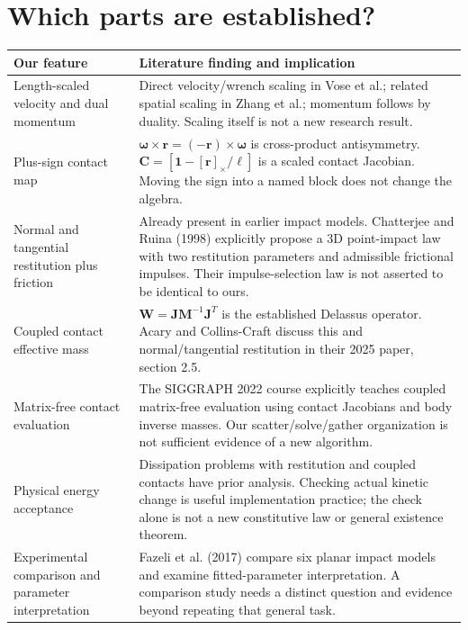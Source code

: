 \documentclass[11pt,a4paper]{article}
\begin{document}
\section{Which parts are established?}
\begin{center}\small
\begin{tabular}{p{45mm}p{102mm}}
\hline
Our feature & Literature finding and implication\\
\hline
Length-scaled velocity and dual momentum & Direct velocity/wrench scaling in Vose et al.; related spatial scaling in Zhang et al.; momentum follows by duality. Scaling itself is not a new research result.\\[3pt]
Plus-sign contact map & $\boldsymbol\omega\times\mathbf r=(-\mathbf r)\times\boldsymbol\omega$ is cross-product antisymmetry. $\mathbf C=[\mathbf1\ {-\,[\mathbf r]_\times/\ell}]$ is a scaled contact Jacobian. Moving the sign into a named block does not change the algebra.\\[3pt]
Normal and tangential restitution plus friction & Already present in earlier impact models. Chatterjee and Ruina (1998) explicitly propose a 3D point-impact law with two restitution parameters and admissible frictional impulses\cite{chatterjee}. Their impulse-selection law is not asserted to be identical to ours.\\[3pt]
Coupled contact effective mass & $\mathbf W=\mathbf J\mathbf M^{-1}\mathbf J^T$ is the established Delassus operator. Acary and Collins-Craft discuss this and normal/tangential restitution in their 2025 paper, section 2.5\cite{acary}.\\[3pt]
Matrix-free contact evaluation & The SIGGRAPH 2022 course explicitly teaches coupled matrix-free evaluation using contact Jacobians and body inverse masses\cite{siggraph}. Our scatter/solve/gather organization is not sufficient evidence of a new algorithm.\\[3pt]
Physical energy acceptance & Dissipation problems with restitution and coupled contacts have prior analysis\cite{acary}. Checking actual kinetic change is useful implementation practice; the check alone is not a new constitutive law or general existence theorem.\\[3pt]
Experimental comparison and parameter interpretation & Fazeli et al. (2017) compare six planar impact models and examine fitted-parameter interpretation\cite{fazeli}. A comparison study needs a distinct question and evidence beyond repeating that general task.\\
\hline
\end{tabular}\end{center}
\end{document}
